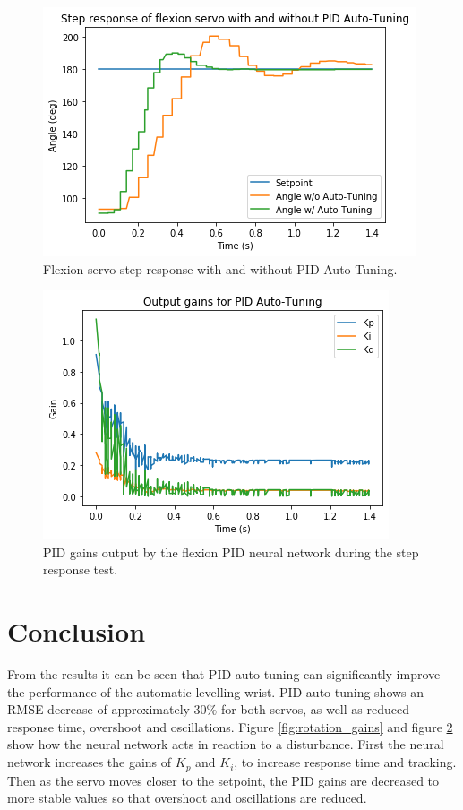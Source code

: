 \documentclass[letterpaper,12pt]{article}
\begin{document}
\begin{figure}[H]
\centering \includegraphics[width=0.8\columnwidth]{flexion_results.png}
\caption{\label{fig:flexion_results}Flexion servo step response with and without PID Auto-Tuning.}
\end{figure}

\begin{figure}[H]
\centering \includegraphics[width=0.8\columnwidth]{flexion_gains.png}
\caption{\label{fig:flexion_gains}PID gains output by the flexion PID neural network during the step response test.}
\end{figure}


\section{Conclusion}
From the results it can be seen that PID auto-tuning can significantly improve the performance of the automatic levelling wrist. PID auto-tuning shows an RMSE decrease of approximately $30\%$ for both servos, as well as reduced response time, overshoot and oscillations. Figure \ref{fig:rotation_gains} and figure \ref{fig:flexion_gains} show how the neural network acts in reaction to a disturbance. First the neural network increases the gains of $K_p$ and $K_i$, to increase response time and tracking. Then as the servo moves closer to the setpoint, the PID gains are decreased to more stable values so that overshoot and oscillations are reduced.
\end{document}
